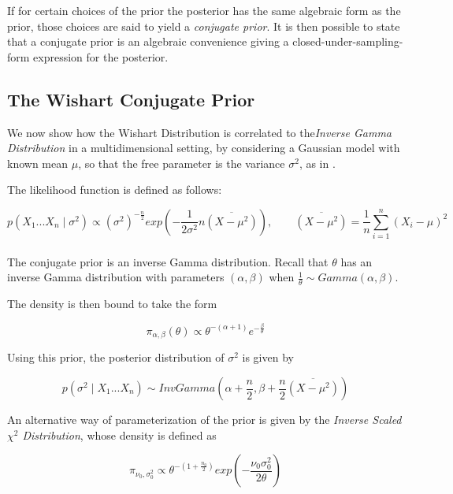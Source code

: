 \documentclass[12pt,openright,twoside,a4paper]{book}
\begin{document}
If for certain choices of the prior the posterior has the same algebraic form as the prior, those choices are said to yield a \textit{conjugate prior}.
It is then possible to state that a conjugate prior is an algebraic convenience giving a closed-under-sampling-form expression for the posterior.

\subsection{The Wishart Conjugate Prior}

We now show how the Wishart Distribution is correlated to the\textit{Inverse Gamma Distribution} in a multidimensional setting, by  considering a Gaussian model with known mean $\mu$, so that the free parameter is the variance  $\sigma^2$, as in \cite{SML}.

The likelihood function is defined as follows:

\begin{equation}
p(X_1...X_n\mid \sigma^2)\propto (\sigma^2)^{-\frac{n}{2}}exp(-\frac{1}{2\sigma^2}n \overline{(X-\mu^2)}) , \qquad \overline{(X-\mu^2)}=\frac{1}{n}\sum_{i=1}^n(X_i-\mu)^2
\label{gausslike}
\end{equation}
\\[12pt]

The conjugate prior is an inverse Gamma distribution. Recall that $\theta$ has an inverse Gamma distribution with parameters $(\alpha,\beta)$   when $\frac{1}{\theta}\sim Gamma(\alpha,\beta)$.

The density is then bound to take the form 

\begin{equation}
\pi_{\alpha,\beta}(\theta)\propto \theta^{-(\alpha+1)}e^{-\frac{\beta}{\theta}}
\end{equation}

Using this prior, the posterior distribution of $\sigma^2$ is given by

\begin{equation}
p( \sigma^2 \mid X_1...X_n)\sim InvGamma(\alpha + \frac{n}{2}, \beta + \frac{n}{2} \overline{(X-\mu^2)})
\end{equation}

An alternative way of parameterization of the prior is given by the \textit{Inverse Scaled $\chi^2$ Distribution}, whose density is defined as

\begin{equation}
\pi_{\nu_0, \sigma_0^2}\propto \theta^{-(1+ \frac{n_0}{2})}exp(-\frac{\nu_0 \sigma_0^2}{2\theta})
\end{equation}
\end{document}
